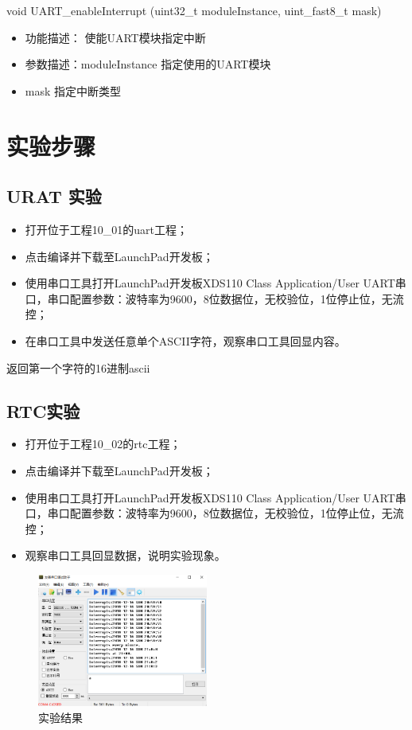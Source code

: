 \documentclass[a4paper,10pt,UTF8]{paper}
\numberwithin{equation}{section}
\numberwithin{figure}{section}
\begin{document}
\begin{ccode}
  void UART_enableInterrupt (uint32_t moduleInstance,   uint_fast8_t mask)
\end{ccode}

\begin{itemize}
  \item 功能描述： 使能UART模块指定中断
  \item 参数描述：moduleInstance  指定使用的UART模块
  \item mask      指定中断类型
\end{itemize}

\section{实验步骤}

\subsection{URAT 实验}

\begin{itemize}
  \item 打开位于工程10\_01的uart工程；
  \item 点击编译并下载至LaunchPad开发板；
  \item 使用串口工具打开LaunchPad开发板XDS110 Class Application/User UART串口，串口配置参数：波特率为9600，8位数据位，无校验位，1位停止位，无流控；
  \item 在串口工具中发送任意单个ASCII字符，观察串口工具回显内容。
\end{itemize}

返回第一个字符的16进制ascii

\subsection{RTC实验}

\begin{itemize}
  \item 打开位于工程10\_02的rtc工程；
  \item 点击编译并下载至LaunchPad开发板；
  \item 使用串口工具打开LaunchPad开发板XDS110 Class Application/User UART串口，串口配置参数：波特率为9600，8位数据位，无校验位，1位停止位，无流控；
  \item 观察串口工具回显数据，说明实验现象。
\end{itemize}

\begin{figure}[h]
  \centering
  \includegraphics[width=0.5\textwidth]{img/4.PNG}
  \caption{实验结果}
  \label{fig:4}
\end{figure}
\end{document}
